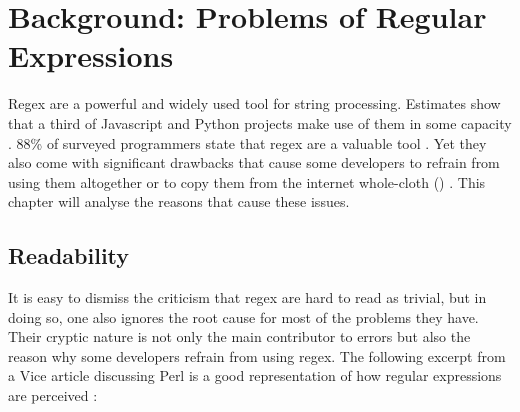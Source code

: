 \chapter{Background: Problems of Regular Expressions} \label{chapter:motivation}

Regex are a powerful and widely used tool for string processing. Estimates show that a third of Javascript and Python projects make use of them in some capacity \cite{RedosInPractice}. 88\% of surveyed programmers state that regex are a valuable tool \cite{RegexesAreHard}. Yet they also come with significant drawbacks that cause some developers to refrain from using them altogether or to copy them from the internet whole-cloth () \cite{RegexesAreHard}. This chapter will analyse the reasons that cause these issues.

{
\hypersetup{citecolor=white}
\begin{boxFigure}[label=fig:regexReuse,title={Percentage of reused regex. Based on \cite{RegexNotLinguaFranca} figure 2.},width=15cm]
    \centering
\end{boxFigure}
}


\section{Readability}

It is easy to dismiss the criticism that regex are hard to read as trivial, but in doing so, one also ignores the root cause for most of the problems they have. Their cryptic nature is not only the main contributor to errors but also the reason why some developers refrain from using regex. The following excerpt from a Vice article discussing Perl is a good representation of how regular expressions are perceived \cite{ViceProgrammingLanguagesProgrammersHate}:

